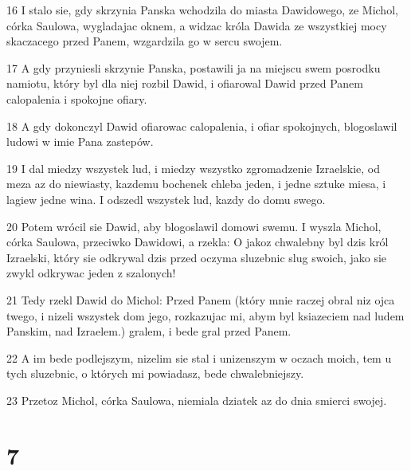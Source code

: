 \par 16 I stalo sie, gdy skrzynia Panska wchodzila do miasta Dawidowego, ze Michol, córka Saulowa, wygladajac oknem, a widzac króla Dawida ze wszystkiej mocy skaczacego przed Panem, wzgardzila go w sercu swojem.
\par 17 A gdy przyniesli skrzynie Panska, postawili ja na miejscu swem posrodku namiotu, który byl dla niej rozbil Dawid, i ofiarowal Dawid przed Panem calopalenia i spokojne ofiary.
\par 18 A gdy dokonczyl Dawid ofiarowac calopalenia, i ofiar spokojnych, blogoslawil ludowi w imie Pana zastepów.
\par 19 I dal miedzy wszystek lud, i miedzy wszystko zgromadzenie Izraelskie, od meza az do niewiasty, kazdemu bochenek chleba jeden, i jedne sztuke miesa, i lagiew jedne wina. I odszedl wszystek lud, kazdy do domu swego.
\par 20 Potem wrócil sie Dawid, aby blogoslawil domowi swemu. I wyszla Michol, córka Saulowa, przeciwko Dawidowi, a rzekla: O jakoz chwalebny byl dzis król Izraelski, który sie odkrywal dzis przed oczyma sluzebnic slug swoich, jako sie zwykl odkrywac jeden z szalonych!
\par 21 Tedy rzekl Dawid do Michol: Przed Panem (który mnie raczej obral niz ojca twego, i nizeli wszystek dom jego, rozkazujac mi, abym byl ksiazeciem nad ludem Panskim, nad Izraelem.) gralem, i bede gral przed Panem.
\par 22 A im bede podlejszym, nizelim sie stal i unizenszym w oczach moich, tem u tych sluzebnic, o których mi powiadasz, bede chwalebniejszy.
\par 23 Przetoz Michol, córka Saulowa, niemiala dziatek az do dnia smierci swojej.

\chapter{7}

